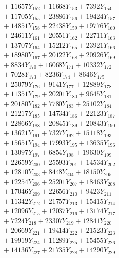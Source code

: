 \documentclass[a4paper,10pt]{article}
\begin{document}
{\begin{align}
&\;  + 11657 Y_{152} + 11668 Y_{153} + 7392 Y_{154} \\[0.3ex]
&\;  + 11705 Y_{155} + 23886 Y_{156} + 19424 Y_{157} \\[0.3ex]
&\;  + 14851 Y_{158} + 22438 Y_{159} + 19776 Y_{160} \\[0.3ex]
&\;  + 24611 Y_{161} + 20551 Y_{162} + 22711 Y_{163} \\[0.3ex]
&\;  + 13707 Y_{164} + 15212 Y_{165} + 23921 Y_{166} \\[0.3ex]
&\;  + 18980 Y_{167} + 20122 Y_{168} + 20926 Y_{169} \\[0.3ex]
&\;  + 8834 Y_{170} + 16068 Y_{171} + 10332 Y_{172} \\[0.3ex]
&\;  + 7028 Y_{173} + 8236 Y_{174} + 8646 Y_{175} \\[0.3ex]
&\;  + 25079 Y_{176} + 9141 Y_{177} + 12889 Y_{178} \\[0.5ex]\allowbreak
&\;  + 11351 Y_{179} + 20201 Y_{180} + 9645 Y_{181} \\[0.3ex]
&\;  + 20180 Y_{182} + 7780 Y_{183} + 25102 Y_{184} \\[0.3ex]
&\;  + 21217 Y_{185} + 14734 Y_{186} + 22123 Y_{187} \\[0.3ex]
&\;  + 22866 Y_{188} + 20845 Y_{189} + 20843 Y_{190} \\[0.3ex]
&\;  + 13621 Y_{191} + 7327 Y_{192} + 15118 Y_{193} \\[0.3ex]
&\;  + 15651 Y_{194} + 17993 Y_{195} + 13635 Y_{196} \\[0.3ex]
&\;  + 13097 Y_{197} + 6854 Y_{198} + 19630 Y_{199} \\[0.3ex]
&\;  + 22659 Y_{200} + 25593 Y_{201} + 14534 Y_{202} \\[0.3ex]
&\;  + 12810 Y_{203} + 8448 Y_{204} + 18150 Y_{205} \\[0.3ex]
&\;  + 12254 Y_{206} + 25201 Y_{207} + 18463 Y_{208} \\[0.5ex]\allowbreak
&\;  + 17046 Y_{209} + 22656 Y_{210} + 9423 Y_{211} \\[0.3ex]
&\;  + 11342 Y_{212} + 21757 Y_{213} + 15415 Y_{214} \\[0.3ex]
&\;  + 12096 Y_{215} + 12037 Y_{216} + 13174 Y_{217} \\[0.3ex]
&\;  + 7224 Y_{218} + 23307 Y_{219} + 12841 Y_{220} \\[0.3ex]
&\;  + 20669 Y_{221} + 19414 Y_{222} + 21523 Y_{223} \\[0.3ex]
&\;  + 19919 Y_{224} + 11289 Y_{225} + 15455 Y_{226} \\[0.3ex]
&\;  + 14136 Y_{227} + 21735 Y_{228} + 14290 Y_{229} \\[0.3ex]

\end{align}}
\end{document}
